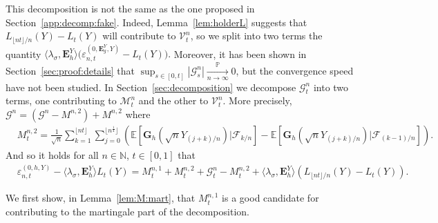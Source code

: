 \documentclass[12pt]{article}
\numberwithin{equation}{section}
\theoremstyle{definition}
\theoremstyle{remark}
\newcommand{\convp}[1][]{\xrightarrow[#1]{\PP}}
\newcommand{\NN}{\mathbb{N}}
\newcommand{\PP}{\mathbb{P}}
\newcommand{\EE}{\mathbb{E}}
\newcommand{\cF}{\mathcal{F}}
\newcommand{\cG}{\mathcal{G}}
\newcommand{\bfH}[1]{\mathbf{E}^Y_{#1}}
\newcommand{\bfG}[1]{\mathbf{G}_{#1}}
\begin{document}
This decomposition is not the same as the one proposed in Section~\ref{app:decomp:fake}.
Indeed, Lemma~\ref{lem:holderL} suggests that $L_{\lfloor n t \rfloor/n}(Y) - L_t(Y) $ will contribute to $\mathcal{V}^n_t$, so we split into two terms the quantity 
$
	 \langle \lambda_\sigma , \bfH h \rangle  \Big( \varepsilon_{n,t}^{(0,\bfH g,Y)} - L_t(Y)\Big).
$ 
%
%
Moreover, it has been shown in Section~\ref{sec:proof:details} that $\sup_{s\in [0,t]} |\cG^n_s|\convp[n\to\infty] 0$,
but the convergence speed have not been studied. In Section~\ref{sec:decomposition} we decompose $\cG^n_t $ into two terms, one contributing to $\mathcal{M}^n_t $ and the other to $\mathcal{V}^n_t $.
%
More precisely, $\cG^n= (\cG^n - M^{n,2} ) +M^{n,2}$
where
\begin{equation} \label{eq:W}
\begin{split}
& M^{n,2}_t  
	= \frac{1}{\sqrt{n}} \sum_{k=1}^{\lfloor n t \rfloor} \sum_{j=0}^{\lfloor n^\frac14\rfloor} \left(\EE\!\left[ \bfG{h}(\sqrt{n} Y_{(j+k)/n})| \cF_{k/n}\right]- \EE\!\left[ \bfG{h}(\sqrt{n} Y_{(j+k)/n})| \cF_{(k-1)/n}\right]\right).
\end{split}
\end{equation}
%
%
And so it holds for all $n\in \NN$, $t\in [0,1]$ that
\begin{equation} 
\begin{split}
	& \varepsilon_{n,t}^{(0,h,Y)}  - \langle \lambda_\sigma , \bfH h \rangle L_t(Y)
	 =		 
	M^{n,1}_t + M^{n,2}_t  + \cG^n_t - M^{n,2}_t + \langle \lambda_\sigma , \bfH h \rangle \left(  L_{\lfloor n t \rfloor/n}(Y) - L_t(Y) \right).
\end{split}
\end{equation}

%
%
%
We first show, in Lemma~\ref{lem:M:mart}, that $M^{n,1}_t$ is a good candidate for contributing to the martingale part of the decomposition.
\end{document}
